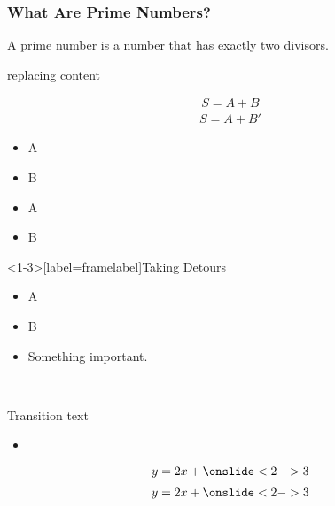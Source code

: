 \documentclass{beamer}
\begin{document}
\begin{frame}
  \frametitle{What Are Prime Numbers?}
  \begin{definition}
    A \alert{prime number} is a number that has exactly two divisors.
  \end{definition}
\end{frame}

\begin{frame}{replacing content}
  \begin{overprint}
    \begin{align*}
      S = A + B
    \end{align*}
    \begin{align*}
      S = A + B'
    \end{align*}
  \end{overprint}

\begin{itemize}[<+->]
\item A
\item B
\end{itemize}

\begin{itemize}[<+-|alert@+>]
\item A
\item B
\end{itemize}

\end{frame}


\begin{frame}<1-3>[label=framelabel]{Taking Detours}
  \begin{itemize}
  \item A
    \pause
  \item B
    \pause
  \item\alert<4->{Something important.
  }
  \end{itemize}
\end{frame}

\

\begin{frame}
  Transition text
  \begin{itemize}
  \item {}
  \end{itemize}
  \begin{equation*} y = 2x + \onslide<2->{3} \end{equation*}
  \begin{align*} y = 2x + \onslide<2->{3} \end{align*}
  
\end{frame}
\end{document}
